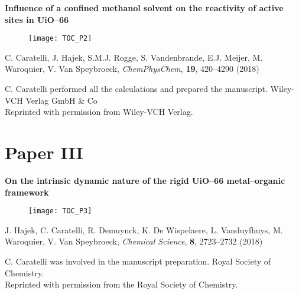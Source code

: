 \vspace{0.1\textheight}
{
\large
\textbf{Influence of a confined methanol solvent on the reactivity of active
sites in UiO--66} }
\begin{figure}[h!]
	\centering
	\texttt{[image: TOC\_P2]}
\end{figure}
 
\noindent
C. Caratelli, J. Hajek, S.M.J. Rogge, S. Vandenbrande, E.J. Meijer, M.
Waroquier, V. Van Speybroeck, \textit{ChemPhysChem}, \textbf{19}, 420--4290
(2018)
\npar

\vfill
\noindent C. Caratelli performed all the calculations and prepared the manuscript.
\npar
\noindent {} Wiley-VCH Verlag GmbH \& Co \\
Reprinted with permission from Wiley-VCH Verlag.

\clearpage{\pagestyle{empty}\cleardoublepage}
 
\clearpage{\pagestyle{empty}\cleardoublepage}
 
\clearpage{\pagestyle{empty}\cleardoublepage}


\section*{Paper III}

\vspace{0.1\textheight}
{
\large
\textbf{On the intrinsic dynamic nature of the rigid UiO--66 metal--organic
framework} }
\begin{figure}[h!]
	\centering
	\texttt{[image: TOC\_P3]}
\end{figure}
 
\noindent
J. Hajek, C. Caratelli, R. Demuynck, K. De Wispelaere, L. Vanduyfhuys, M.
Waroquier, V. Van Speybroeck, \textit{Chemical Science}, \textbf{8}, 2723--2732
(2018)

\vfill

\noindent C. Caratelli was involved in the manuscript preparation.
\npar
\noindent {} Royal Society of Chemistry. \\
Reprinted with permission from the Royal Society of Chemistry.

\clearpage{\pagestyle{empty}\cleardoublepage}
 
\clearpage{\pagestyle{empty}\cleardoublepage}


